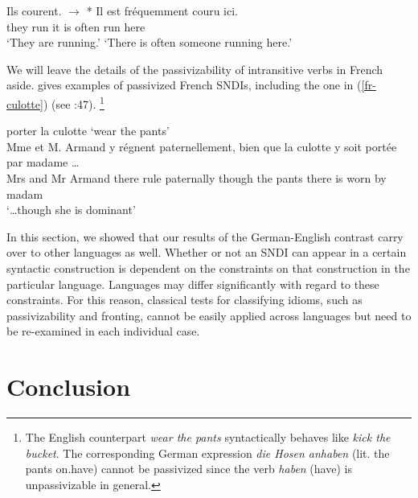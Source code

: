 \documentclass[output=paper]{langsci/langscibook}
\begin{document}
\begin{exe}
\ex\label{fr-pass}
\begin{xlist}
\ex \label{fr-pass-run}
{
\gll Ils courent. $\longrightarrow$  * Il est fr\'equemment couru ici.\\
they run {} {} it is often run here\\
\glt `They are running.'  {} {}  `There is often someone running here.'
}
\end{xlist}
\end{exe}

We will leave the details of the  passivizability of intransitive verbs in French aside. \cite{Gaatone:93} gives examples of passivized French SNDIs, including the one in (\ref{fr-culotte}) (see \citeauthor{Gaatone:93} \citeyear{Gaatone:93}:47).%
\footnote{The English counterpart \textit{wear the pants} syntactically behaves like \textit{kick the bucket}. The corresponding German expression \textit{die Hosen anhaben} (lit. the pants on.have) cannot be passivized since the verb \textit{haben} (have) is unpassivizable in general.} 

\ea porter la culotte `wear the pants'\\
\gll Mme et M. Armand y r\'egnent paternellement, {bien que} la culotte y soit port\'ee par
madame \ldots\\
Mrs and Mr Armand there rule paternally {though} the pants there is worn by madam\\
\glt `\ldots though she is dominant'\label{fr-culotte}
\z

In this section, we showed that our results of the German-English contrast carry over to other languages as well. Whether or not an SNDI can appear in a certain syntactic construction is dependent on the constraints on that construction in the particular language. Languages may differ significantly with regard to these constraints. For this reason, classical tests for classifying idioms, such as passivizability and fronting, cannot be easily applied across languages but need to be re-examined in each individual case.



\section{Conclusion}
\label{Sec-Conclusion}
\end{document}
